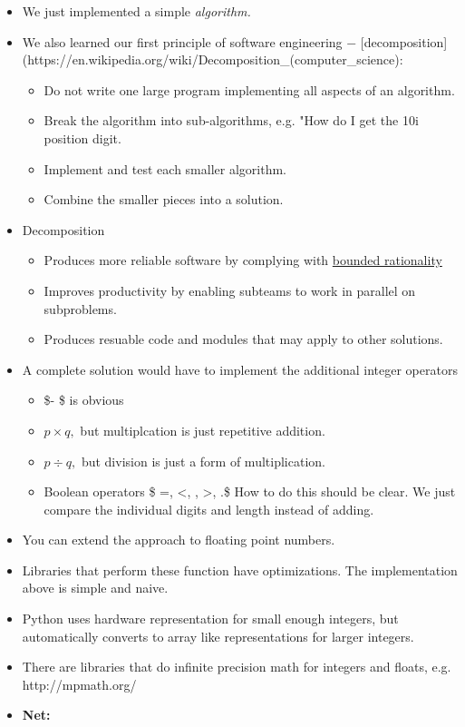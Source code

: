 \documentclass[11pt]{article}
\providecommand{\tightlist}{%
      \setlength{\itemsep}{0pt}\setlength{\parskip}{0pt}}
\def\gt{>}
\def\lt{<}
\begin{document}
\begin{itemize}
\item
  We just implemented a simple \emph{algorithm.}
\item
  We also learned our first principle of software engineering \(-\)
  {[}decomposition{]}(https://en.wikipedia.org/wiki/Decomposition\_(computer\_science):

  \begin{itemize}
  \tightlist
  \item
    Do not write one large program implementing all aspects of an
    algorithm.
  \item
    Break the algorithm into sub-algorithms, e.g. "How do I get the 10i
    position digit.
  \item
    Implement and test each smaller algorithm.
  \item
    Combine the smaller pieces into a solution.
  \end{itemize}
\item
  Decomposition

  \begin{itemize}
  \tightlist
  \item
    Produces more reliable software by complying with
    \href{https://en.wikipedia.org/wiki/Bounded_rationality}{bounded
    rationality}
  \item
    Improves productivity by enabling subteams to work in parallel on
    subproblems.
  \item
    Produces resuable code and modules that may apply to other
    solutions.
  \end{itemize}
\item
  A complete solution would have to implement the additional integer
  operators

  \begin{itemize}
  \tightlist
  \item
    \$- \$ is obvious
  \item
    \(p \times q,\) but multiplcation is just repetitive addition.
  \item
    \(p \div q,\) but division is just a form of multiplication.
  \item
    Boolean operators \$ =, \lt, \le, \gt, \ge.\$ How to do this should
    be clear. We just compare the individual digits and length instead
    of adding.
  \end{itemize}
\item
  You can extend the approach to floating point numbers.
\item
  Libraries that perform these function have optimizations. The
  implementation above is simple and naive.
\item
  Python uses hardware representation for small enough integers, but
  automatically converts to array like representations for larger
  integers.
\item
  There are libraries that do infinite precision math for integers and
  floats, e.g. http://mpmath.org/
\item
  \textbf{Net:}


\end{itemize}
\end{document}
